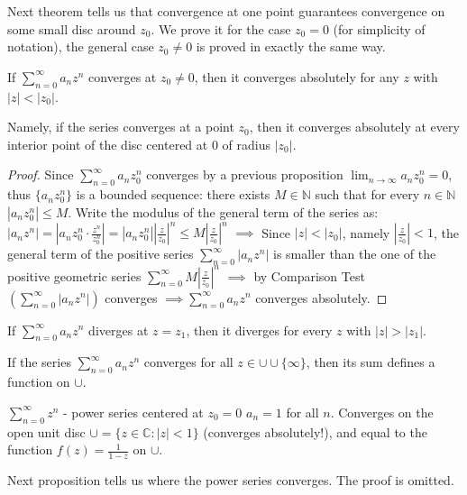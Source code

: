 \documentclass[12pt]{article}
\begin{document}
Next theorem tells us that convergence at one point guarantees convergence on some small disc around $z_0$. We prove it for the case $z_0 = 0$ (for simplicity of notation), the general case $z_0 \neq 0$ is proved in exactly the same way.

\begin{theorem}[Abel]
If $\sum_{n=0}^\infty a_nz^n$ converges at $z_0 \neq 0$, then it converges absolutely for any $z$ with $|z| < |z_0|$.
\end{theorem}
Namely, if the series converges at a point $z_0$, then it converges absolutely at every interior point of the disc centered at 0 of radius $|z_0|$.

\begin{proof}
Since $\sum_{n=0}^\infty a_nz_0^n$ converges by a previous proposition $\lim_{n\to\infty} a_nz_0^n = 0$, thus $\{a_nz_0^n\}$ is a bounded sequence: there exists $M \in \mathbb{N}$ such that for every $n \in \mathbb{N}$ $|a_nz_0^n| \leq M$.
Write the modulus of the general term of the series as:
$|a_nz^n| = |a_nz_0^n \cdot \frac{z^n}{z_0^n}| = |a_nz_0^n||\frac{z}{z_0}|^n \leq M|\frac{z}{z_0}|^n$
$\implies$ Since $|z| < |z_0|$, namely $|\frac{z}{z_0}| < 1$, the general term of the positive series $\sum_{n=0}^\infty |a_nz^n|$ is smaller than the one of the positive geometric series $\sum_{n=0}^\infty M|\frac{z}{z_0}|^n$ $\implies$ by Comparison Test $(\sum_{n=0}^\infty |a_nz^n|)$ converges $\implies \sum_{n=0}^\infty a_nz^n$ converges absolutely.
\end{proof}

\begin{corollary}
If $\sum_{n=0}^\infty a_nz^n$ diverges at $z=z_1$, then it diverges for every $z$ with $|z| > |z_1|$.
\end{corollary}

\begin{definition}
If the series $\sum_{n=0}^\infty a_nz^n$ converges for all $z \in \cup \cup \{\infty\}$, then its sum defines a function on $\cup$.
\end{definition}

\begin{example}[continued]
$\sum_{n=0}^\infty z^n$ - power series centered at $z_0 = 0$
$a_n = 1$ for all $n$. Converges on the open unit disc $\cup = \{z \in \mathbb{C}: |z| < 1\}$ (converges absolutely!), and equal to the function $f(z) = \frac{1}{1-z}$ on $\cup$.
\end{example}

Next proposition tells us where the power series converges. The proof is omitted.
\end{document}
